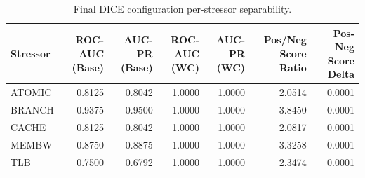 \begin{table}[t]
\centering
\caption{Final DICE configuration per-stressor separability.}
\label{tab:dice_full_stressor}
\footnotesize
\begin{tabular}{lrrrrrr}
\toprule
Stressor & ROC-AUC (Base) & AUC-PR (Base) & ROC-AUC (WC) & AUC-PR (WC) & Pos/Neg Score Ratio & Pos-Neg Score Delta \\
\midrule
ATOMIC & 0.8125 & 0.8042 & 1.0000 & 1.0000 & 2.0514 & 0.0001 \\
BRANCH & 0.9375 & 0.9500 & 1.0000 & 1.0000 & 3.8450 & 0.0001 \\
CACHE & 0.8125 & 0.8042 & 1.0000 & 1.0000 & 2.0817 & 0.0001 \\
MEMBW & 0.8750 & 0.8875 & 1.0000 & 1.0000 & 3.3258 & 0.0001 \\
TLB & 0.7500 & 0.6792 & 1.0000 & 1.0000 & 2.3474 & 0.0001 \\
\bottomrule
\end{tabular}

\end{table}

